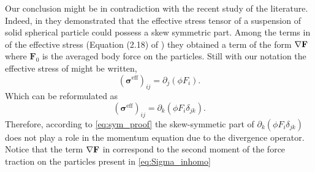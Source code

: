 Our conclusion might be in contradiction with the recent study of the literature. 
Indeed, in \cite{wolgemuth2023continuum} they demonstrated that the effective stress tensor of a suspension of solid spherical particle could possess a skew symmetric part. 
Among the terms in of the effective stress (Equation (2.18) of \cite{wolgemuth2023continuum}) they obtained a term of the form $\mathbf{\nabla} \textbf{F}$ where $\textbf{F}_0$ is the averaged body force on the particles. 
Still with our notation the effective stress of \citet{wolgemuth2023continuum} might be written, 
\begin{equation*}
    (\bm\sigma^\text{eff})_{ij}
    = \partial_j(\phi F_i). 
\end{equation*}
Which can be reformulated as 
\begin{equation*}
    (\bm\sigma^\text{eff})_{ij}
    = \partial_k(\phi F_i \delta_{jk}). 
\end{equation*}
Therefore, according to \ref{eq:sym_proof} the skew-symmetic part of $\partial_k(\phi F_i \delta_{jk})$ does not play a role in the momentum equation due to the divergence operator. 
Notice that the term $\mathbf{\nabla} \textbf{F}$ in \citet{wolgemuth2023continuum} correspond to the second moment of the force traction on the particles present in \ref{eq:Sigma_inhomo}